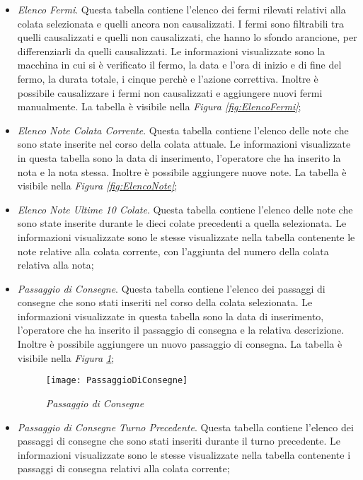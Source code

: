 \begin{itemize}
    \item \textit{Elenco Fermi}. Questa tabella contiene l'elenco dei fermi rilevati relativi alla colata selezionata 
    e quelli ancora non causalizzati. I fermi sono filtrabili tra quelli causalizzati e quelli non causalizzati,
    che hanno lo sfondo arancione, per differenziarli da quelli causalizzati. Le informazioni visualizzate sono la macchina
    in cui si è verificato il fermo, la data e l'ora di inizio e di fine del fermo, la durata totale, i cinque perchè e
    l'azione correttiva. Inoltre è possibile causalizzare i fermi non causalizzati e aggiungere nuovi fermi manualmente.
    La tabella è visibile nella \textit{Figura \ref{fig:ElencoFermi}};
    
    \item \textit{Elenco Note Colata Corrente}. Questa tabella contiene l'elenco delle note che sono state inserite nel corso
    della colata attuale. Le informazioni visualizzate in questa tabella sono la data di inserimento, l'operatore che ha inserito
    la nota e la nota stessa. Inoltre è possibile aggiungere nuove note. La tabella è visibile nella
    \textit{Figura \ref{fig:ElencoNote}};
    
    \item \textit{Elenco Note Ultime 10 Colate}. Questa tabella contiene l'elenco delle note che sono state inserite durante le
    dieci colate precedenti a quella selezionata. Le informazioni visualizzate sono le stesse visualizzate nella tabella
    contenente le note relative alla colata corrente, con l'aggiunta del numero della colata relativa alla nota;
    
    \item \textit{Passaggio di Consegne}. Questa tabella contiene l'elenco dei passaggi di consegne che sono stati inseriti
    nel corso della colata selezionata. Le informazioni visualizzate in questa tabella sono la data di inserimento, l'operatore
    che ha inserito il passaggio di consegna e la relativa descrizione. Inoltre è possibile aggiungere un nuovo passaggio
    di consegna.
    La tabella è visibile nella \textit{Figura \ref{fig:PassaggioDiConsegne}};

    \begin{figure}[H]
      \texttt{[image: PassaggioDiConsegne]}
      \centering
      \caption{\textit{Passaggio di Consegne}}
      \label{fig:PassaggioDiConsegne}
    \end{figure}
    
    \item \textit{Passaggio di Consegne Turno Precedente}. Questa tabella contiene l'elenco dei passaggi di consegne che sono
    stati inseriti durante il turno precedente. Le informazioni visualizzate sono le stesse visualizzate nella tabella
    contenente i passaggi di consegna relativi alla colata corrente;
    

\end{itemize}

